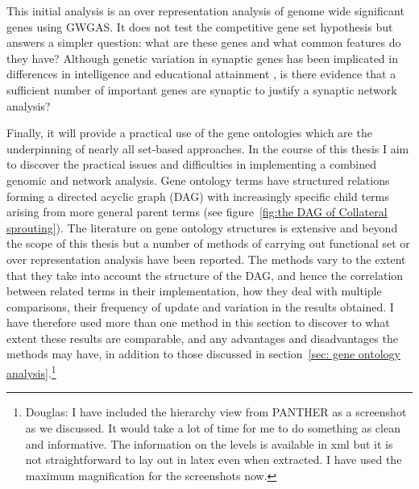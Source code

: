  This initial analysis  is an over representation analysis of genome wide significant genes using GWGAS. It does not test the competitive gene set hypothesis but answers a simpler question: what are these genes and what common features do they have? Although genetic variation in synaptic genes has been implicated in differences in intelligence and educational attainment \cite{hill2014human}\cite{okbay2016genome}, is there evidence that a sufficient number of important genes are synaptic to justify a synaptic network analysis?

Finally, it will provide a practical use of the gene ontologies which are the underpinning of nearly all set-based approaches. In the course of this thesis I aim to discover the practical issues and difficulties in implementing a combined genomic and network analysis. Gene ontology terms have structured relations  forming a directed acyclic graph (DAG) with increasingly specific child terms arising from more general parent terms (see figure~\ref{fig:the DAG of Collateral sprouting}). The literature on gene ontology structures is extensive and beyond the scope of this thesis but a number of methods of carrying out functional set or over representation analysis have been reported. The methods vary to the extent that they take into account the structure of the DAG, and hence the correlation between related terms in their implementation, how they deal with multiple comparisons, their frequency of update and variation in the results obtained\cite{khatri2005ontological}\cite{rhee2008use}.  I have therefore used more than one method in this section to discover to what extent these results are comparable, and any advantages and disadvantages the methods may have, in addition to those discussed in section~\ref{sec: gene ontology analysis}.\footnote{Douglas: I have included the hierarchy view from PANTHER as a screenshot as we discussed. It would take a lot of time for me to do something as clean and informative. The information on the levels is available in xml but it is not straightforward to lay out in latex even when extracted. I have used the maximum magnification for the screenshots now.}
 

